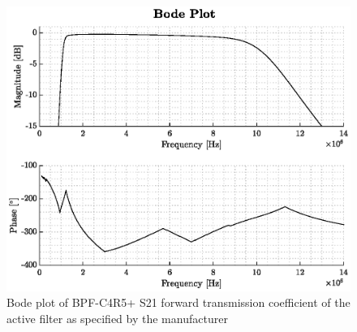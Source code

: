 \begin{figure}[htbp]
	\centering
	\includegraphics[width=.8\textwidth]{Figures/3_bpf_s21_vals.eps}
	\caption[Bode plot of bandpass filter]{Bode plot of BPF-C4R5+ S21 forward transmission coefficient of the active filter as specified by the manufacturer}
	\label{fig:3_bpf_s21_bode_plot}
\end{figure}

